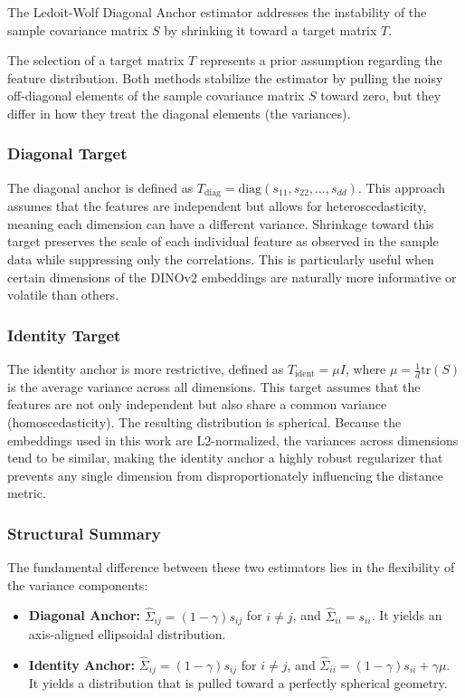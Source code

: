 The Ledoit-Wolf Diagonal Anchor estimator addresses the instability of the sample covariance matrix $S$ by shrinking it toward a target matrix $T$.

The selection of a target matrix $T$ represents a prior assumption regarding the feature distribution. Both methods stabilize the estimator by pulling the noisy off-diagonal elements of the sample covariance matrix $S$ toward zero, but they differ in how they treat the diagonal elements (the variances).

\subsubsection{Diagonal Target}
The diagonal anchor is defined as $T_{\text{diag}} = \text{diag}(s_{11}, s_{22}, \dots, s_{dd})$. This approach assumes that the features are independent but allows for heteroscedasticity, meaning each dimension can have a different variance. Shrinkage toward this target preserves the scale of each individual feature as observed in the sample data while suppressing only the correlations. This is particularly useful when certain dimensions of the DINOv2 embeddings are naturally more informative or volatile than others.

\subsubsection{Identity Target}The identity anchor is more restrictive, defined as $T_{\text{ident}} = \mu I$, where $\mu = \frac{1}{d} \text{tr}(S)$ is the average variance across all dimensions. This target assumes that the features are not only independent but also share a common variance (homoscedasticity). The resulting distribution is spherical. Because the embeddings used in this work are L2-normalized, the variances across dimensions tend to be similar, making the identity anchor a highly robust regularizer that prevents any single dimension from disproportionately influencing the distance metric.

\subsubsection{Structural Summary}The fundamental difference between these two estimators lies in the flexibility of the variance components:

\begin{itemize}
	\item \textbf{Diagonal Anchor:} $\hat{\Sigma}_{ij} = (1-\gamma)s_{ij}$ for $i \neq j$, and $\hat{\Sigma}_{ii} = s_{ii}$. It yields an axis-aligned ellipsoidal distribution.
	\item \textbf{Identity Anchor:} $\hat{\Sigma}_{ij} = (1-\gamma)s_{ij}$ for $i \neq j$, and $\hat{\Sigma}_{ii} = (1-\gamma)s_{ii} + \gamma \mu$. It yields a distribution that is pulled toward a perfectly spherical geometry.
\end{itemize}

